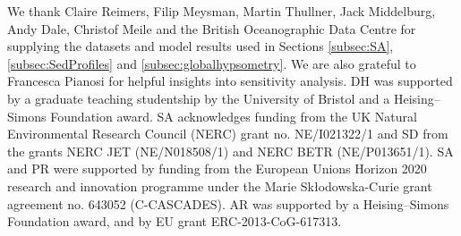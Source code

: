 \documentclass[gmd, manuscript]{copernicus}
\begin{document}




\begin{acknowledgements}
We thank Claire Reimers, Filip Meysman, Martin Thullner, Jack Middelburg, Andy Dale, Christof Meile and the British Oceanographic Data Centre for supplying the datasets and model results used in 
Sections \ref{subsec:SA}, \ref{subsec:SedProfiles} and  \ref{subsec:globalhypsometry}. 
We are also grateful to Francesca Pianosi for helpful insights into sensitivity analysis. 
DH was supported by a graduate teaching studentship by the University of Bristol and a Heising–Simons Foundation award. SA acknowledges funding from the UK Natural Environmental Research Council (NERC) grant no. NE/I021322/1 and 
SD from the grants NERC JET (NE/N018508/1) and NERC BETR (NE/P013651/1). 
SA and PR were supported by funding from the European Unions Horizon 2020 research and innovation programme under the Marie Sk\l{}odowska-Curie grant agreement no. 643052 (C-CASCADES). 
AR was supported by a Heising–Simons Foundation award, and by EU grant ERC-2013-CoG-617313. 
\end{acknowledgements}
\end{document}
